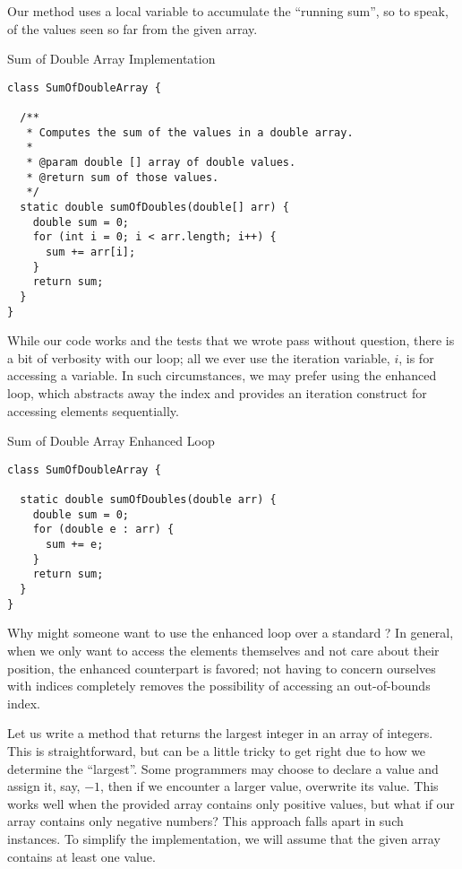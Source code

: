 Our method uses a local variable to accumulate the ``running sum'', so to speak, of the values seen so far from the given array.

\begin{cl}{Sum of Double Array Implementation}
\begin{lstlisting}[language=MyJava]
class SumOfDoubleArray {

  /**
   * Computes the sum of the values in a double array.
   *
   * @param double [] array of double values.
   * @return sum of those values.
   */
  static double sumOfDoubles(double[] arr) {
    double sum = 0;
    for (int i = 0; i < arr.length; i++) {
      sum += arr[i];
    }
    return sum;
  }
}
\end{lstlisting}
\end{cl}
While our code works and the tests that we wrote pass without question, there is a bit of verbosity with our loop; all we ever use the iteration variable, $i$, is for accessing a variable. In such circumstances, we may prefer using the enhanced  loop, which abstracts away the index and provides an iteration construct for accessing elements sequentially.
\begin{cl}{Sum of Double Array Enhanced  Loop}
\begin{lstlisting}[language=MyJava]
class SumOfDoubleArray {

  static double sumOfDoubles(double arr) {
    double sum = 0;
    for (double e : arr) {
      sum += e;
    }
    return sum;
  }
}
\end{lstlisting}
\end{cl}
Why might someone want to use the enhanced  loop over a standard ? In general, when we only want to access the elements themselves and not care about their position, the enhanced counterpart is favored; not having to concern ourselves with indices completely removes the possibility of accessing an out-of-bounds index. 

\example Let us write a method that returns the largest integer in an array of integers. This is straightforward, but can be a little tricky to get right due to how we determine the ``largest''. Some programmers may choose to declare a value  and assign it, say, $-1$, then if we encounter a larger value, overwrite its value. This works well when the provided array contains only positive values, but what if our array contains only negative numbers? This approach falls apart in such instances. To simplify the implementation, we will assume that the given array contains at least one value.

